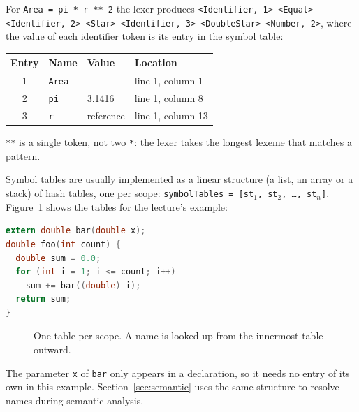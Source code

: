 For \texttt{Area = pi * r ** 2} the lexer produces
\texttt{<Identifier, 1> <Equal> <Identifier, 2> <Star> <Identifier, 3> <DoubleStar> <Number, 2>},
where the value of each identifier token is its entry in the symbol table:
\begin{center}
\small
\begin{tabular}{c l l l}
  \toprule
  Entry & Name & Value & Location \\
  \midrule
  1 & \texttt{Area} &                & line 1, column 1 \\
  2 & \texttt{pi}   & 3.1416         & line 1, column 8 \\
  3 & \texttt{r}    & reference      & line 1, column 13 \\
  \bottomrule
\end{tabular}
\end{center}
\texttt{**} is a single token, not two \texttt{*}: the lexer takes the longest
lexeme that matches a pattern.

Symbol tables are usually implemented as a linear structure (a list, an array
or a stack) of hash tables, one per scope:
\texttt{symbolTables = [st$_1$, st$_2$, \dots, st$_n$]}. Figure~\ref{fig:symtab-stack}
shows the tables for the lecture's example:
\begin{lstlisting}[language=C]
extern double bar(double x);
double foo(int count) {
  double sum = 0.0;
  for (int i = 1; i <= count; i++)
    sum += bar((double) i);
  return sum;
}
\end{lstlisting}

\begin{figure}[h]
\centering
{}
\caption{One table per scope. A name is looked up from the innermost table outward.}
\label{fig:symtab-stack}
\end{figure}

The parameter \texttt{x} of \texttt{bar} only appears in a declaration, so it
needs no entry of its own in this example. Section~\ref{sec:semantic} uses the
same structure to resolve names during semantic analysis.


